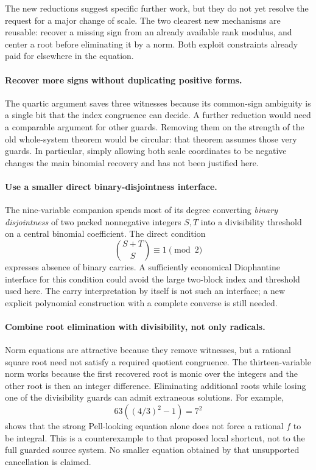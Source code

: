 \documentclass[11pt,a4paper]{article}
\numberwithin{equation}{section}
\begin{document}
The new reductions suggest specific further work, but they do not yet
resolve the request for a major change of scale. The two clearest new
mechanisms are reusable: recover a missing sign from an already available
rank modulus, and center a root before eliminating it by a norm.
Both exploit constraints already paid for elsewhere in the equation.

\paragraph{Recover more signs without duplicating positive forms.}
The quartic argument saves three witnesses because its common-sign
ambiguity is a single bit that the index congruence can decide. A further
reduction would need a comparable argument for other guards. Removing
them on the strength of the old whole-system theorem would be circular:
that theorem assumes those very guards. In particular, simply allowing
both scale coordinates to be negative changes the main binomial recovery
and has not been justified here.

\paragraph{Use a smaller direct binary-disjointness interface.}
The nine-variable companion spends most of its degree converting
\emph{binary disjointness} of two packed nonnegative integers $S,T$ into
a divisibility threshold on a central binomial coefficient. The direct
condition
\[
 \binom{S+T}{S}\equiv1\pmod2
\]
expresses absence of binary carries. A sufficiently economical
Diophantine interface for this condition could avoid the large two-block
index and threshold used here. The carry interpretation by itself is
not such an interface; a new explicit polynomial construction with a
complete converse is still needed.

\paragraph{Combine root elimination with divisibility, not only radicals.}
Norm equations are attractive because they remove witnesses, but a
rational square root need not satisfy a required quotient congruence.
The thirteen-variable norm works because the first recovered root is
monic over the integers and the other root is then an integer difference.
Eliminating additional roots while losing one of the divisibility guards
can admit extraneous solutions. For example,
\[
 63\left((4/3)^2-1\right)=7^2
\]
shows that the strong Pell-looking equation alone does not force a
rational $f$ to be integral. This is a counterexample to that proposed
local shortcut, not to the full guarded source system. No smaller
equation obtained by that unsupported cancellation is claimed.
\end{document}
